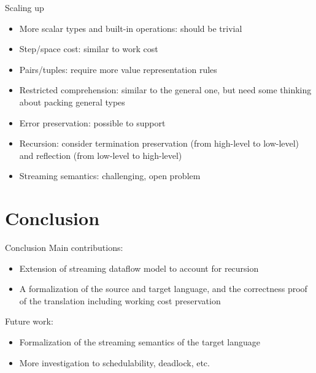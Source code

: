 \documentclass{beamer}
\begin{document}
\begin{frame}{Scaling up}
\begin{itemize}
	\item More scalar types and built-in operations: should be trivial
	\item Step/space cost: similar to work cost
	\item Pairs/tuples: require more value representation rules
	\item Restricted comprehension: similar to the general one, but need some thinking about packing general types 
	\item Error preservation: possible to support
	\item Recursion: consider termination preservation (from high-level to low-level) and reflection (from low-level to high-level) 
	\item Streaming semantics: challenging, open problem
\end{itemize}
\end{frame}


\section{Conclusion}

\begin{frame}{Conclusion}
	Main contributions:
	\begin{itemize}
		\item Extension of streaming dataflow model to account for recursion 
		\item A formalization of the source and target language, and the correctness proof of the translation including working cost preservation
	\end{itemize}

	Future work:
	\begin{itemize}
	\item Formalization of the streaming semantics of the target language
	\item More investigation to schedulability, deadlock, etc.
	\end{itemize}
\end{frame}

\end{document}
